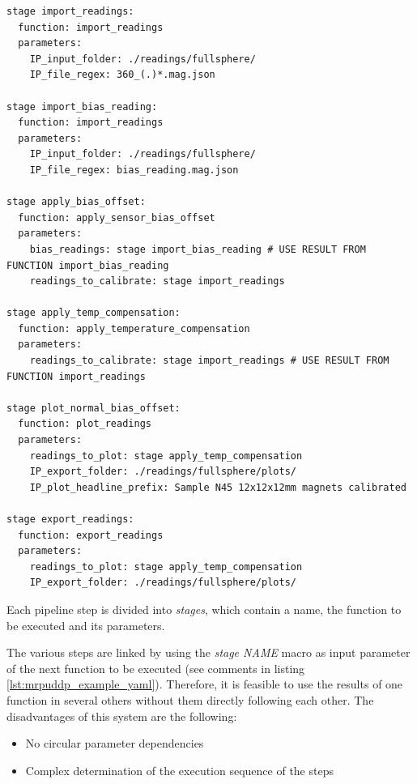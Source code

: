 \newpage

\begin{lstlisting}[caption={Example YAML code of a user defined processing pipeline with six stages linked together}, label=lst:mrpuddp_example_yaml]
stage import_readings:
  function: import_readings
  parameters:
    IP_input_folder: ./readings/fullsphere/
    IP_file_regex: 360_(.)*.mag.json

stage import_bias_reading:
  function: import_readings
  parameters:
    IP_input_folder: ./readings/fullsphere/
    IP_file_regex: bias_reading.mag.json

stage apply_bias_offset:
  function: apply_sensor_bias_offset
  parameters:
    bias_readings: stage import_bias_reading # USE RESULT FROM FUNCTION import_bias_reading
    readings_to_calibrate: stage import_readings

stage apply_temp_compensation:
  function: apply_temperature_compensation
  parameters:
    readings_to_calibrate: stage import_readings # USE RESULT FROM FUNCTION import_readings

stage plot_normal_bias_offset:
  function: plot_readings
  parameters:
    readings_to_plot: stage apply_temp_compensation
    IP_export_folder: ./readings/fullsphere/plots/
    IP_plot_headline_prefix: Sample N45 12x12x12mm magnets calibrated

stage export_readings:
  function: export_readings
  parameters:
    readings_to_plot: stage apply_temp_compensation
    IP_export_folder: ./readings/fullsphere/plots/
\end{lstlisting}

\newpage

Each pipeline step is divided into \emph{stages}, which contain a name,
the function to be executed and its parameters.

The various steps are linked by using the \emph{stage NAME} macro as
input parameter of the next function to be executed (see comments in
listing \ref{lst:mrpuddp_example_yaml}). Therefore, it is feasible to
use the results of one function in several others without them directly
following each other. The disadvantages of this system are the
following:

\begin{itemize}
\tightlist
\item
  No circular parameter dependencies
\item
  Complex determination of the execution sequence of the steps
\end{itemize}

